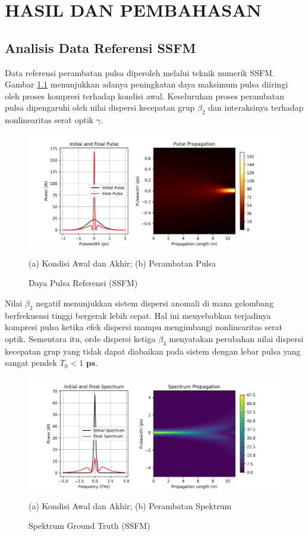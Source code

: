 \chapter{HASIL DAN PEMBAHASAN}

\section{Analisis Data Referensi SSFM}

Data referensi perambatan pulsa diperoleh melalui teknik numerik SSFM. Gambar \ref{fig:reference} menunjukkan adanya peningkatan daya maksimum pulsa diiringi oleh proses kompresi terhadap kondisi awal. Keseluruhan proses perambatan pulsa dipengaruhi oleh nilai dispersi kecepatan grup $\beta_2$ dan interaksinya terhadap nonlinearitas serat optik $\gamma$.


\begin{figure}[htbp]
    \centering
    \includegraphics[width=1\linewidth]{Gambar/GroundTruth3D.png}
    \caption{Daya Pulsa Referensi (SSFM)}
    (a) Kondisi Awal dan Akhir; (b) Perambatan Pulsa
    \label{fig:reference}
\end{figure}

Nilai $\beta_2$ negatif menunjukkan sistem dispersi anomali di mana gelombang berfrekuensi tinggi bergerak lebih cepat. Hal ini menyebabkan terjadinya kompresi pulsa ketika efek dispersi mampu mengimbangi nonlinearitas serat optik. Sementara itu, orde dispersi ketiga $\beta_3$ menyatakan perubahan nilai dispersi kecepatan grup yang tidak dapat diabaikan pada sistem dengan lebar pulsa yang sangat pendek $T_0 < 1 \textbf{ ps}$.

\begin{figure}[htbp]
    \centering
    \includegraphics[width=1\linewidth]{Gambar/GroundTruthS3D.png}
    \caption{Spektrum Ground Truth (SSFM)}
    (a) Kondisi Awal dan Akhir; (b) Perambatan Spektrum
    \label{fig:referenceS}
\end{figure}

